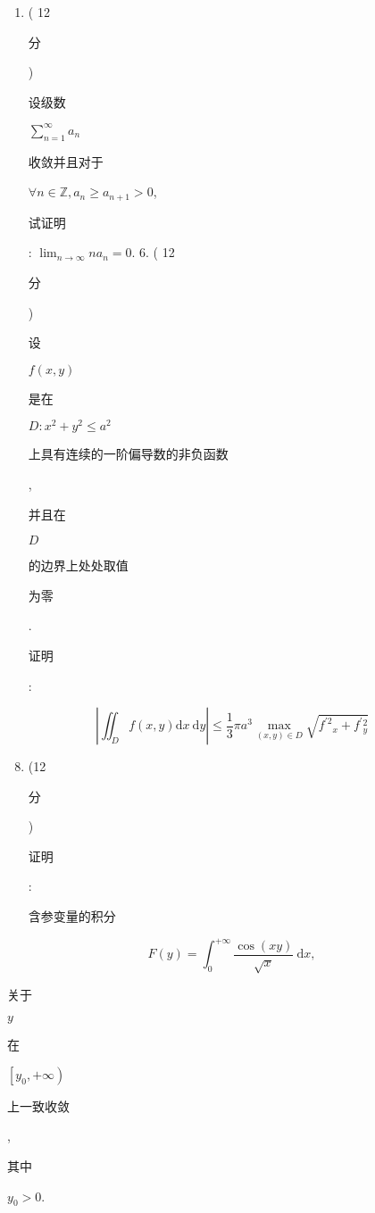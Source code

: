 \documentclass[10pt]{article}
\begin{document}
\begin{enumerate}
  \item ( 12 \begin{CJK}{UTF8}{mj}分\end{CJK}) \begin{CJK}{UTF8}{mj}设级数\end{CJK} $\sum_{n=1}^{\infty} a_{n}$ \begin{CJK}{UTF8}{mj}收敛并且对于\end{CJK} $\forall n \in \mathbb{Z}, a_{n} \geqslant a_{n+1}>0$, \begin{CJK}{UTF8}{mj}试证明\end{CJK}: $\lim _{n \rightarrow \infty} n a_{n}=0$. 6. ( 12 \begin{CJK}{UTF8}{mj}分\end{CJK}) \begin{CJK}{UTF8}{mj}设\end{CJK} $f(x, y)$ \begin{CJK}{UTF8}{mj}是在\end{CJK} $D: x^{2}+y^{2} \leqslant a^{2}$ \begin{CJK}{UTF8}{mj}上具有连续的一阶偏导数的非负函数\end{CJK}, \begin{CJK}{UTF8}{mj}并且在\end{CJK} $D$ \begin{CJK}{UTF8}{mj}的边界上处处取值\end{CJK} \begin{CJK}{UTF8}{mj}为零\end{CJK}. \begin{CJK}{UTF8}{mj}证明\end{CJK}:

\end{enumerate}
$$
\left|\iint_{D} f(x, y) \mathrm{d} x \mathrm{~d} y\right| \leqslant \frac{1}{3} \pi a^{3} \max _{(x, y) \in D} \sqrt{f^{\prime 2}{ }_{x}+f^{\prime}{ }_{y}^{2}}
$$

\begin{enumerate}
  \setcounter{enumi}{7}
  \item (12 \begin{CJK}{UTF8}{mj}分\end{CJK}) \begin{CJK}{UTF8}{mj}证明\end{CJK}: \begin{CJK}{UTF8}{mj}含参变量的积分\end{CJK}
\end{enumerate}
$$
F(y)=\int_{0}^{+\infty} \frac{\cos (x y)}{\sqrt{x}} \mathrm{~d} x,
$$
\begin{CJK}{UTF8}{mj}关于\end{CJK} $y$ \begin{CJK}{UTF8}{mj}在\end{CJK} $\left[y_{0},+\infty\right)$ \begin{CJK}{UTF8}{mj}上一致收敛\end{CJK}, \begin{CJK}{UTF8}{mj}其中\end{CJK} $y_{0}>0$.
\end{document}
